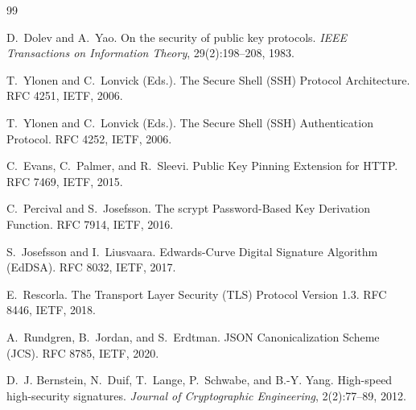 \documentclass[11pt,a4paper]{article}
\begin{document}

\begin{thebibliography}{99}

D.~Dolev and A.~Yao.
\newblock On the security of public key protocols.
\newblock \emph{IEEE Transactions on Information Theory}, 29(2):198--208,
1983.

T.~Ylonen and C.~Lonvick (Eds.).
\newblock The Secure Shell (SSH) Protocol Architecture.
\newblock RFC 4251, IETF, 2006.

T.~Ylonen and C.~Lonvick (Eds.).
\newblock The Secure Shell (SSH) Authentication Protocol.
\newblock RFC 4252, IETF, 2006.

C.~Evans, C.~Palmer, and R.~Sleevi.
\newblock Public Key Pinning Extension for HTTP.
\newblock RFC 7469, IETF, 2015.

C.~Percival and S.~Josefsson.
\newblock The scrypt Password-Based Key Derivation Function.
\newblock RFC 7914, IETF, 2016.

S.~Josefsson and I.~Liusvaara.
\newblock Edwards-Curve Digital Signature Algorithm (EdDSA).
\newblock RFC 8032, IETF, 2017.

E.~Rescorla.
\newblock The Transport Layer Security (TLS) Protocol Version 1.3.
\newblock RFC 8446, IETF, 2018.

A.~Rundgren, B.~Jordan, and S.~Erdtman.
\newblock JSON Canonicalization Scheme (JCS).
\newblock RFC 8785, IETF, 2020.

D.~J. Bernstein, N.~Duif, T.~Lange, P.~Schwabe, and B.-Y. Yang.
\newblock High-speed high-security signatures.
\newblock \emph{Journal of Cryptographic Engineering}, 2(2):77--89, 2012.


\end{thebibliography}
\end{document}
